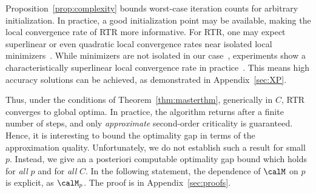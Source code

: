 \documentclass{article}
\newcommand{\1}{\mathbf{1}}
\begin{document}
Proposition~\ref{prop:complexity} bounds worst-case iteration counts for arbitrary initialization. In practice, a good initialization point may be available, making the local convergence rate of RTR more informative. For RTR, one may expect superlinear or even quadratic local convergence rates near isolated local minimizers~\citep{genrtr}.
While minimizers are not isolated in our case~\citep{journee2010low}, experiments show a characteristically superlinear local convergence rate in practice~\citep{boumal2015staircase}.
This means high accuracy solutions can be achieved, as demonstrated in Appendix~\ref{sec:XP}. %

Thus, under the conditions of Theorem~\ref{thm:masterthm}, generically in $C$, RTR converges to global optima. In practice, the algorithm returns after a finite number of steps, and only \emph{approximate} second-order criticality is guaranteed. Hence, it is interesting to bound the optimality gap in terms of the approximation quality. Unfortunately, we do not establish such a result for small $p$. Instead, we give an a posteriori computable optimality gap bound which holds for \emph{all} $p$ and for \emph{all} $C$.
In the following statement, the dependence of $\calM$ on $p$ is explicit, as $\calM_p$. The proof is in Appendix~\ref{sec:proofs}.

\end{document}
